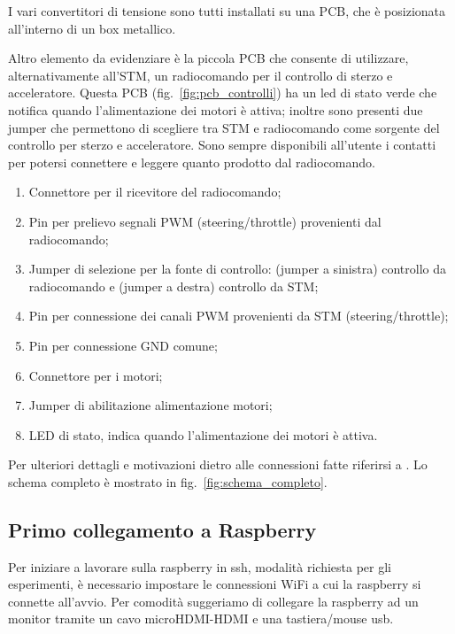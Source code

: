 I vari convertitori di tensione sono tutti installati su una PCB, che è posizionata all’interno di un box metallico.

Altro elemento da evidenziare \`e la piccola PCB che consente di utilizzare, alternativamente all’STM, un radiocomando per il controllo di sterzo e acceleratore.
Questa PCB (fig.~\ref{fig:pcb_controlli}) ha un led di stato verde che notifica quando l’alimentazione dei motori è attiva; 
inoltre sono presenti due jumper che permettono di scegliere tra STM e radiocomando come sorgente del controllo per sterzo e acceleratore. 
Sono sempre disponibili all’utente i contatti per potersi connettere e leggere quanto prodotto dal radiocomando.

\begin{enumerate}
    \item Connettore per il ricevitore del radiocomando;
    \item Pin per prelievo segnali PWM (steering/throttle) provenienti dal radiocomando;
    \item Jumper di selezione per la fonte di controllo: (jumper a sinistra) controllo da radiocomando e (jumper a destra) controllo da STM;
	\item Pin per connessione dei canali PWM provenienti da STM (steering/throttle);
    \item Pin per connessione GND comune;
    \item Connettore per i motori;
    \item Jumper di abilitazione alimentazione motori;
    \item LED di stato, indica quando l'alimentazione dei motori è attiva.
\end{enumerate}

Per ulteriori dettagli e motivazioni dietro alle connessioni fatte riferirsi a \cite{ptvlocalizzazione}.
Lo schema completo è mostrato in fig.~\ref{fig:schema_completo}.

\subsection{Primo collegamento a Raspberry}
\label{sez: primo collegamento a raspberry}

Per iniziare a lavorare sulla raspberry in ssh, modalit\`a richiesta per gli esperimenti, \`e necessario impostare le connessioni WiFi a cui la raspberry si
connette all'avvio. Per comodit\`a suggeriamo di collegare la raspberry ad un monitor tramite un cavo microHDMI-HDMI e una tastiera/mouse usb.

